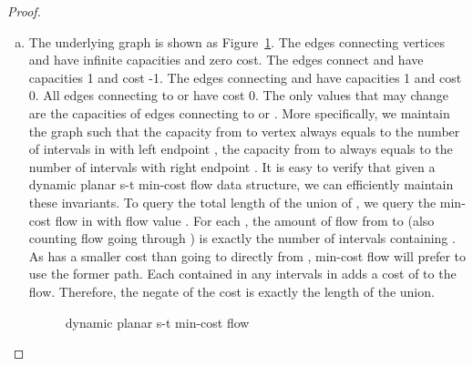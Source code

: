 \documentclass[11pt]{article}
\begin{document}
{\begin{proof}
\begin{enumerate}[(a)]
	\item
	The underlying graph is shown as Figure~\ref{figflow}. The edges connecting vertices  and  have infinite capacities and zero cost. The edges connect  and  have capacities 1 and cost -1. The edges connecting  and  have capacities 1 and cost 0. All edges connecting to  or  have cost 0. The only values that may change are the capacities of edges connecting to  or . More specifically, we maintain the graph such that the capacity from  to vertex  always equals to the number of intervals in  with left endpoint , the capacity from  to  always equals to the number of intervals with right endpoint . It is easy to verify that given a dynamic planar s-t min-cost flow data structure, we can efficiently maintain these invariants. To query the total length of the union of , we query the min-cost flow in  with flow value . For each , the amount of flow from  to  (also counting flow going through ) is exactly the number of intervals containing . As  has a smaller cost than going to  directly from , min-cost flow will prefer to use the former path. Each  contained in any intervals in  adds a cost of  to the flow. Therefore, the negate of the cost is exactly the length of the union. 
	
\begin{figure}
\centering
{}
\caption{dynamic planar s-t min-cost flow}\label{figflow}
\end{figure}	
	

\end{enumerate}
\end{proof}}
\end{document}
